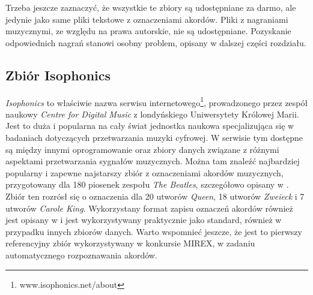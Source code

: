 \begin{table}
    \centering
    \caption{Fragment indeksu zbioru danych po pierwszym etapie jego tworzenia.}
    \label{tab:indeks_01}
\end{table}

Trzeba jeszcze zaznaczyć, że wszystkie te zbiory są udostępniane za darmo, ale jedynie jako same
pliki tekstowe z oznaczeniami akordów. Pliki z nagraniami muzycznymi, ze względu na prawa autorskie,
nie są udostępniane. Pozyskanie odpowiednich nagrań stanowi osobny problem, opisany w dalszej części
rozdziału.

\subsection{Zbiór Isophonics}

\emph{Isophonics} to właściwie nazwa serwisu internetowego\footnote{www.isophonics.net/about},
prowadzonego przez zespół naukowy \emph{Centre for Digital Music} z londyńskiego Uniwersytety
Królowej Marii. Jest to duża i popularna na cały świat jednostka naukowa specjalizująca się w
badaniach dotyczących przetwarzania muzyki cyfrowej. W serwisie tym dostępne są między innymi
oprogramowanie oraz zbiory danych związane z różnymi aspektami przetwarzania sygnałów muzycznych.
Można tam znaleźć najbardziej popularny i zapewne najstarszy zbiór z oznaczeniami akordów
muzycznych, przygotowany dla 180 piosenek zespołu \emph{The Beatles}, szczegółowo opisany w
\cite{harte_towards_nodate}. Zbiór ten rozrósł się o oznaczenia dla 20 utworów \emph{Queen}, 18
utworów \emph{Zweieck} i 7 utworów \emph{Carole King}. Wykorzystany format zapisu oznaczeń akordów
również jest opisany w \cite{harte_towards_nodate} i jest wykorzystywany praktycznie jako standard,
również w przypadku innych zbiorów danych. Warto wspomnieć jeszcze, że jest to pierwszy referencyjny
zbiór wykorzystywany w konkursie MIREX, w zadaniu automatycznego rozpoznawania akordów.

